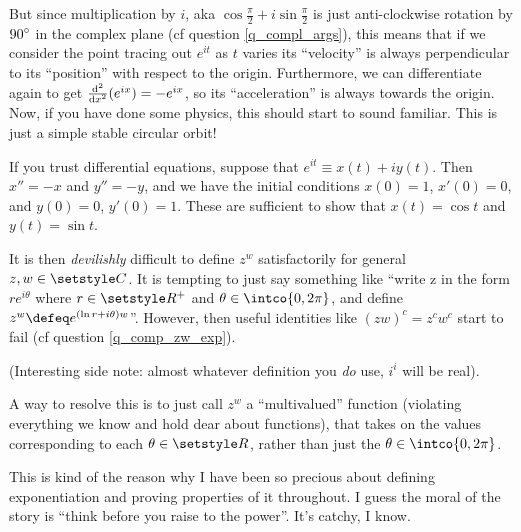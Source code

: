 But since multiplication by \(i\), aka
\(\cos \frac \pi 2 + i \sin \frac \pi 2\) is just anti-clockwise rotation by
\({90}^\circ\) in the complex plane (cf question \ref{q_compl_args}), this
means that if we consider the point tracing out \(e^{it}\) as \(t\) varies its
``velocity'' is always perpendicular to its ``position'' with respect to the
origin. Furthermore, we can differentiate again to get
\(\dv[2]{x} (e^{ix}) = -e^{ix}\), so its ``acceleration'' is always towards the
origin. Now, if you have done some physics, this should start to sound familiar.
This is just a simple stable circular orbit!

If you trust differential equations, suppose that
\(e^{it} \equiv x(t) + i y(t)\). Then \(x'' = -x\) and \(y'' = -y\), and we have
the initial conditions \(x(0) = 1\), \(x'(0) = 0\), and \(y(0) = 0\),
\(y'(0) = 1\). These are sufficient to show that
\(x(t) = \cos t\) and \(y(t) = \sin t\).

It is then \emph{devilishly} difficult to define \(z^w\) satisfactorily for
general \(z, w \in \Complex\). It is tempting to just say something like ``write
z in the form \(re^{i\theta}\) where \(r \in \Reals^+\) and
\(\theta \in \intco{0, 2\pi}\), and define
\(z^w \defeq e^{(\ln r + i\theta)w}\)''.
However, then useful identities like \((zw)^c = z^c w^c\) start to fail (cf
question \ref{q_comp_zw_exp}).

(Interesting side note: almost whatever definition you \emph{do} use, \(i^i\)
will be real).

A way to resolve this is to just call \(z^w\) a ``multivalued'' function
(violating everything we know and hold dear about functions), that takes on
the values corresponding to each \(\theta \in \Reals\), rather than just the
\(\theta \in \intco{0, 2\pi}\).

This is kind of the reason why I have been so precious about defining
exponentiation and proving properties of it throughout. I guess the moral of the
story is ``think before you raise to the power''. It's catchy, I know.
